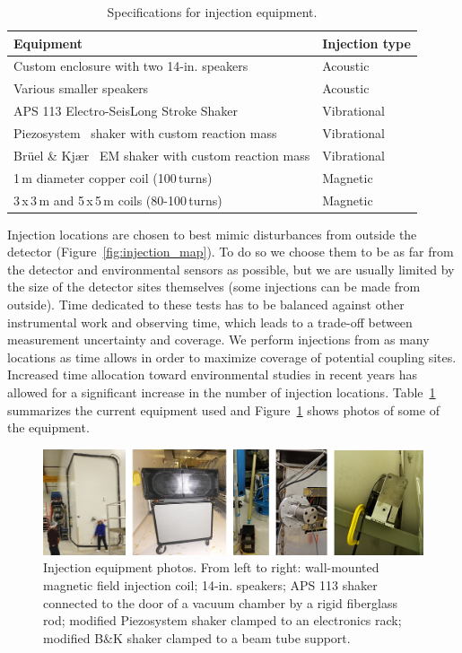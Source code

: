 \begin{table}[h!]
\caption{\label{tab:injectors}Specifications for injection equipment.}
\begin{tabular}{|ll|}
	\hline
	Equipment & Injection type \\
	\hline
	Custom enclosure with two 14-in. speakers & Acoustic\\
	Various smaller speakers & Acoustic\\
	APS 113 Electro-Seis\reg Long Stroke Shaker~\citep{big_shaker} & Vibrational\\
	Piezosystem\reg~\citep{piezo} shaker with custom reaction mass & Vibrational\\
	Br\"uel \& Kj\ae r\reg~\citep{bk} EM shaker with custom reaction mass & Vibrational\\
	1\,m diameter copper coil (100\,turns) & Magnetic\\
	3\,x\,3\,m and 5\,x\,5\,m coils (80-100\,turns) & Magnetic\\ \hline
\end{tabular}
\end{table}


Injection locations are chosen to best mimic disturbances from outside the detector (Figure~\ref{fig:injection_map}).
To do so we choose them to be as far from the detector and environmental sensors as possible, but we are usually limited by the size of the detector sites themselves (some injections can be made from outside).
Time dedicated to these tests has to be balanced against other instrumental work and observing time, which leads to a trade-off between measurement uncertainty and coverage.
We perform injections from as many locations as time allows in order to maximize coverage of potential coupling sites.
Increased time allocation toward environmental studies in recent years has allowed for a significant increase in the number of injection locations.
Table~\ref{tab:injectors} summarizes the current equipment used and Figure~\ref{fig:injection_equipment} shows photos of some of the equipment.

\begin{figure}[h!]
	\centering
	\includegraphics[width=\textwidth]{figures/injection-equipment.png}
	\caption{Injection equipment photos. From left to right: wall-mounted magnetic field injection coil; 14-in. speakers; APS 113 shaker connected to the door of a vacuum chamber by a rigid fiberglass rod; modified Piezosystem shaker clamped to an electronics rack; modified B\&K shaker clamped to a beam tube support.}
	\label{fig:injection_equipment}
\end{figure}

